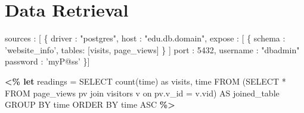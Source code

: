 \section{Data Retrieval}
\label{section:dataretrieval}

\begin{figure*}
\centering
%
%
\begin{minipage}[c]{6cm}
\begin{minipage}[c]{6cm}
\begin{code}
   sources : [ \{ 
     driver   : "postgres", 
     host     : "edu.db.domain", 
     expose   : [ \{
      schema : 'website_info', 
      tables: [visits, page_views] \} ]
     port     : 5432, 
     username : "dbadmin" 
     password : 'myP@ss'
   \}] 
\end{code}
\label{figure:source-config-file}
\end{minipage}
%
\begin{minipage}[c]{6cm}
\begin{code}
\textbf{<\% let} readings = 
   SELECT count(time) as visits, time
   FROM (SELECT * FROM page_views pv 
  	     join visitors v 
         on pv.v_id = v.vid) AS joined_table
   GROUP BY time 
   ORDER BY time ASC \textbf{\%>}
\end{code}
\vspace*{-0.3cm}
\label{figure:first-running-example:data-retrieval}
\vspace*{0.3cm}
\end{minipage}


\end{minipage}
\end{figure*}

